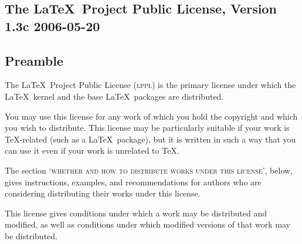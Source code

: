 \begin{LPPLicense}
    \providecommand{\LPPLsection}{\section*}
    \providecommand{\LPPLsubsection}{\subsection*}
    \providecommand{\LPPLsubsubsection}{\subsubsection*}
    \providecommand{\LPPLparagraph}{\paragraph*}
    \providecommand*{\LPPLfile}[1]{\texttt{#1}}
    \providecommand*{\LPPLdocfile}[1]{`\LPPLfile{#1.tex}'}
    \providecommand*{\LPPL}{\textsc{lppl}}

    \LPPLsection{The \LaTeX\ Project Public License, Version 1.3c 2006-05-20}
    \label{LPPL:LPPL}


    \LPPLsubsection{Preamble}
    \label{LPPL:Preamble}

    The \LaTeX\ Project Public License (\LPPL) is the primary license under
    which the \LaTeX\ kernel and the base \LaTeX\ packages are distributed.

    You may use this license for any work of which you hold the copyright and
    which you wish to distribute.  This license may be particularly suitable if
    your work is \TeX-related (such as a \LaTeX\ package), but it is written in
    such a way that you can use it even if your work is unrelated to \TeX.

    The section `\textsc{whether and how to distribute works under this
    license}', below, gives instructions, examples, and recommendations for
    authors who are considering distributing their works under this license.

    This license gives conditions under which a work may be distributed and
    modified, as well as conditions under which modified versions of that work
    may be distributed.


\end{LPPLicense}
